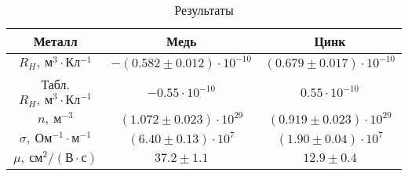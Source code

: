\begin{table}
\centering
\caption{Результаты}
\begin{tabular}{|c|c|c|}
\hline
Металл & Медь & Цинк \\
\hline
$R_H,\ м^3 \cdot Кл^{-1}$ & $-(0.582 \pm 0.012) \cdot 10^{-10}$ & $(0.679 \pm 0.017) \cdot 10^{-10}$ \\
\hline
Табл. $R_H,\ м^3 \cdot Кл^{-1}$ & $-0.55 \cdot 10^{-10}$ & $0.55 \cdot 10^{-10}$ \\
\hline
$n,\ м^{-3}$ & $(1.072 \pm 0.023) \cdot 10^{29}$ & $(0.919 \pm 0.023) \cdot 10^{29}$ \\
\hline
$\sigma,\ Ом^{-1} \cdot м^{-1}$ & $(6.40 \pm 0.13) \cdot 10^7$ & $(1.90 \pm 0.04) \cdot 10^7$ \\
\hline
$\mu,\ см^2/(В \cdot с)$ & $37.2 \pm 1.1$ & $12.9 \pm 0.4$ \\
\hline
\end{tabular}
\end{table}